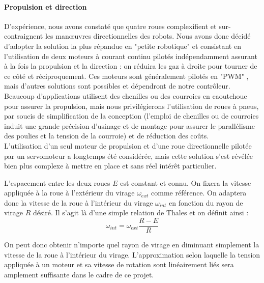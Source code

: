 		\paragraph{Propulsion et direction}

			D’expérience, nous avons constaté que quatre roues complexifient et sur-contraignent les manœuvres directionnelles des robots. Nous avons donc décidé d'adopter la solution la plus répandue en "petite robotique" et consistant en l'utilisation de deux moteurs à courant continu pilotés indépendamment assurant à la fois la propulsion et la direction : on réduira les gaz à droite pour tourner de ce côté et réciproquement. Ces moteurs sont généralement pilotés en "PWM" , mais d'autres solutions sont possibles et dépendront de notre contrôleur. Beaucoup d'applications utilisent des chenilles ou des courroies en caoutchouc pour assurer la propulsion, mais nous privilégierons l’utilisation de roues à pneus, par soucis de simplification de la conception (l'emploi de chenilles ou de courroies induit  une grande précision d'usinage et de montage pour assurer le parallélisme des poulies et la tension de la courroie) et de réduction des coûts.\\

			L'utilisation d'un seul moteur de propulsion et d'une roue directionnelle pilotée par un servomoteur a longtemps été considérée, mais cette solution s'est révélée bien plus complexe à mettre en place et sans réel intérêt particulier.\\


			L'espacement entre les deux roues $E$ est constant et connu.
			On fixera la vitesse appliquée à la roue à l'extérieur du virage $\omega_{ext}$ comme référence.
			On adaptera donc la vitesse de la roue à l'intérieur du virage $\omega_{int}$ en fonction du rayon de virage $R$ désiré.
			Il s'agit là d'une simple relation de Thales et on définit ainsi :
			\[\omega_{int} = \omega_{ext}\frac{R-E}{R}\]

			On peut donc obtenir n'importe quel rayon de virage en diminuant simplement la vitesse de la roue à l'intérieur du virage.
			L'approximation selon laquelle la tension appliquée à un moteur et sa vitesse de rotation sont linéairement liés sera amplement suffisante dans le cadre de ce projet.\\

